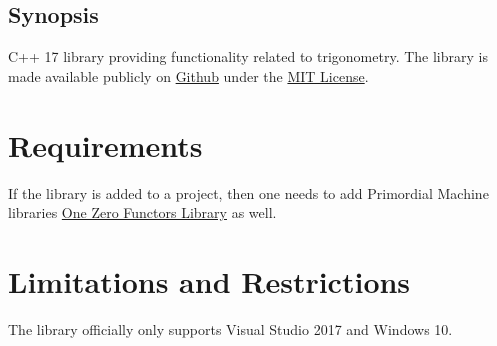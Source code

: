 \documentclass[oneside]{report}
\begin{document}
\maketitle
\tableofcontents
\section{Synopsis}
C++ 17 library providing functionality related to trigonometry.
The library is made available publicly on
\href{\GetLibraryRepository}{Github}
under the
\href{\GetLibraryRepository/blob/master/LICENSE}{MIT License}.

\chapter{Requirements}
If the library is added to a project, then one needs to add Primordial Machine libraries
\href{https://github.com/primordialmachine/one-zero-functors}{One Zero Functors Library}
as well.

\chapter{Limitations and Restrictions}
The library officially only supports Visual Studio 2017 and Windows 10.

\end{document}
